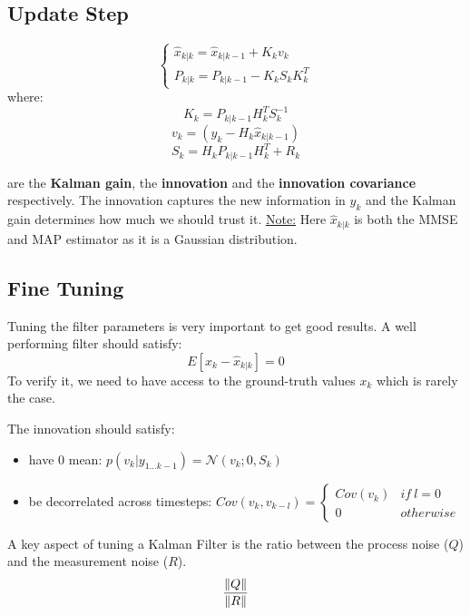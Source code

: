 \subsection{Update Step}
\begin{equation}
    \left\{\begin{array}{c}
        \hat{x}_{k|k} = \hat{x}_{k|k-1} + K_k v_k \\
        P_{k|k} = P_{k|k-1} - K_k S_k K_k^T
    \end{array}\right.
\end{equation}
where:
\begin{equation}
    K_k = P_{k|k-1} H_k^T S_k^{-1}
\end{equation}
\begin{equation}
    v_k = (y_k - H_k \hat{x}_{k|k-1})
\end{equation}
\begin{equation}
    S_k = H_k P_{k|k-1} H_k^T + R_k
\end{equation}

are the \textbf{Kalman gain}, the \textbf{innovation} and the \textbf{innovation covariance} respectively.
The innovation captures the new information in $y_k$ and the Kalman gain determines how much we should trust it.
\underline{Note:} Here $\hat{x}_{k|k}$ is both the MMSE and MAP estimator as it is a Gaussian distribution.

\subsection{Fine Tuning}
Tuning the filter parameters is very important to get good results.
A well performing filter should satisfy:
\begin{equation}
    E[x_k - \hat{x}_{k|k}] = 0
\end{equation}
To verify it, we need to have access to the ground-truth values $x_k$ which is rarely the case.


The innovation should satisfy:
\begin{itemize}
    \item have 0 mean: $p(v_k|y_{1\dots k-1}) = \mathcal{N}(v_k; 0, S_k)$
    \item be decorrelated across timesteps: $Cov(v_k, v_{k-l}) = \left\{\begin{array}{cc}
        Cov(v_k) & if\:l=0\\
        0 & otherwise
    \end{array}\right.$
\end{itemize}

A key aspect of tuning a Kalman Filter is the ratio between the process noise ($Q$) and the measurement noise ($R$).
\begin{equation}
    \frac{\left\lVert Q\right\rVert}{\left\lVert R\right\rVert}
\end{equation}

